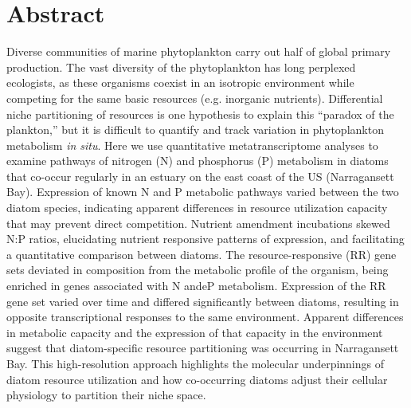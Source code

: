\section{Abstract}
Diverse communities of marine phytoplankton carry out half of global primary production. The vast diversity of the phytoplankton has long perplexed ecologists, as these organisms coexist in an isotropic environment while competing for the same basic resources (e.g. inorganic nutrients). Differential niche partitioning of resources is one hypothesis to explain this ``paradox of the plankton,'' but it is difficult to quantify and track variation in phytoplankton metabolism \textit{in situ}. Here we use quantitative metatranscriptome analyses to examine pathways of nitrogen (N) and phosphorus (P) metabolism in diatoms that co-occur regularly in an estuary on the east coast of the US (Narragansett Bay). Expression of known N and P metabolic pathways varied between the two diatom species, indicating apparent differences in resource utilization capacity that may prevent direct competition.  Nutrient amendment incubations skewed N:P ratios, elucidating nutrient responsive patterns of expression, and facilitating a quantitative comparison between diatoms. The resource-responsive (RR) gene sets deviated in composition from the metabolic profile of the organism, being enriched in genes associated with N andeP metabolism. Expression of the RR gene set varied over time and differed significantly between diatoms, resulting in opposite transcriptional responses to the same environment. Apparent differences in metabolic capacity and the expression of that capacity in the environment suggest that diatom-specific resource partitioning was occurring in Narragansett Bay. This high-resolution approach highlights the molecular underpinnings of diatom resource utilization and how co-occurring diatoms adjust their cellular physiology to partition their niche space. 
 
